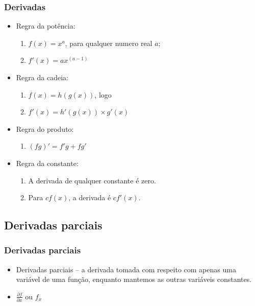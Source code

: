 \begin{frame}
\frametitle{Derivadas}

  \begin{itemize}[<+-| alert@+>]
    \item Regra da potência:
      \begin{enumerate}[<+-| alert@+>]
        \item $f(x) = x^a$, para qualquer numero real $a$;
        \item $f'(x) = ax^{(a-1)}$
      \end{enumerate}
    \item Regra da cadeia:
      \begin{enumerate}[<+-| alert@+>]
        \item $f(x) = h(g(x))$, logo
        \item $f'(x) = h'(g(x)) \times g'(x)$
      \end{enumerate}
    \item Regra do produto:
      \begin{enumerate}[<+-| alert@+>]
        \item $(fg)' = f'g + fg'$
      \end{enumerate}
    \item Regra da constante:
      \begin{enumerate}[<+-| alert@+>]
        \item A derivada de qualquer constante é zero.
        \item Para $c f(x)$, a derivada é $c f'(x)$.
      \end{enumerate}
  \end{itemize}

\end{frame}


\subsection{Derivadas parciais}

\begin{frame}
\frametitle{Derivadas parciais}

  \begin{itemize}[<+-| alert@+>]
    \item Derivadas parciais -- a derivada tomada com respeito com apenas uma
          variável de uma função, enquanto mantemos as outras variáveis
          constantes.
    \item $\frac{\partial f}{\partial x}$ ou $f_x$
  \end{itemize}

\end{frame}


